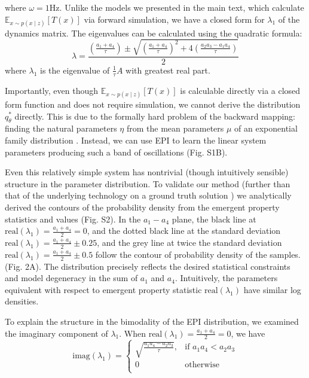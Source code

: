 \documentclass[11pt]{article}
\begin{document}
where $\omega = 1$Hz.  Unlike the models we presented in the main text, which calculate $\mathbb{E}_{x \sim p(x \mid z)} \left[T(x) \right]$ via forward simulation, we have a closed  form for $\lambda_1$ of the dynamics matrix.  The eigenvalues can be calculated using the quadratic formula: 
\begin{equation}
\lambda = \frac{(\frac{a_1 + a_4}{\tau}) \pm \sqrt{(\frac{a_1+a_4}{\tau})^2 + 4(\frac{a_2 a_3 - a_1 a_4}{\tau})}}{2}
\end{equation}
where $\lambda_1$ is the eigenvalue of $\frac{1}{\tau}A$ with greatest real part. 

Importantly, even though $\mathbb{E}_{x\sim p(x \mid z)}\left[T(x)\right]$ is calculable directly via a closed form function and does not require simulation, we cannot derive the distribution $q^*_\theta$ directly.  This is due to the formally hard problem of the backward mapping: finding the natural parameters $\eta$ from the mean parameters $\mu$ of an exponential family distribution \cite{wainwright2008graphical}.  Instead, we can use EPI to learn the linear system parameters producing such a band of oscillations (Fig. S1B). 

Even this relatively simple system has nontrivial (though intuitively sensible) structure in the parameter distribution.  To validate our method (further than that of the underlying technology on a ground truth solution \cite{loaiza2017maximum}) we analytically derived the contours of the probability density from the emergent property statistics and values (Fig. S2).  In the $a_1-a_4$ plane, the black line at $\text{real}(\lambda_1) = \frac{a_1 + a_4}{2} = 0$, and the dotted black line at
the standard deviation $\text{real}(\lambda_1) = \frac{a_1 + a_4}{2} \pm 0.25$, and the grey line at twice the standard deviation
$\text{real}(\lambda_1) = \frac{a_1 + a_4}{2} \pm 0.5$ follow the contour of probability density of the samples. (Fig. 2A). The distribution precisely reflects the desired statistical constraints and model degeneracy in the sum of
$a_1$ and $a_4$. Intuitively, the parameters equivalent with respect to emergent property statistic $\text{real}(\lambda_1)$ have similar log densities.

To explain the structure in the bimodality of the EPI distribution, we examined the imaginary component of $\lambda_1$.  When $\text{real}(\lambda_1) = \frac{a_1 + a_4}{2} = 0$, we have
\begin{equation}
\text{imag}(\lambda_1) = \begin{cases}
                             \sqrt{\frac{a_1 a_4 - a_2 a_3}{\tau}},  & \text{if } a_1 a_4 < a_2 a_3 \\
                             0 & \text{otherwise } \\
                         \end{cases} 
\end{equation}
\end{document}
